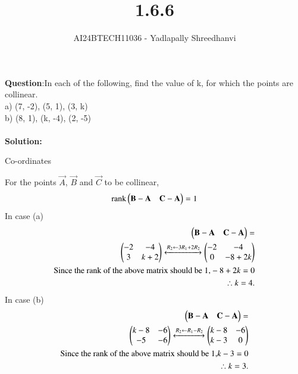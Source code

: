 \documentclass[journal]{IEEEtran}
\begin{document}

\vspace{3cm}

\title{1.6.6}
\author{AI24BTECH11036 - Yadlapally Shreedhanvi}
{\let\newpage\relax\maketitle}

\renewcommand{\thefigure}{\theenumi}
\renewcommand{\thetable}{\theenumi}
\setlength{\intextsep}{10pt} %


\renewcommand{\thetable}{\theenumi}


\textbf{Question}:In each of the following, find the value of k, for which the points are collinear.\\
a) (7, -2), (5, 1), (3, k)\\
b) (8, 1), (k, -4), (2, -5)\\ \\

\textbf{Solution: }

\begin{table}[h!]    
  \centering
  
  \caption{Co-ordinates}
  \label{tab1.6.6.1}
\end{table}

For the points $\vec{A}$, $\vec{B}$  and  $\vec{C}$ to be collinear,
\begin{align}
	\text{rank} \begin{pmatrix} \mathbf{B-A} & \mathbf{C-A}\end{pmatrix}=1
\end{align}
In case (a)
\begin{align*}
\begin{pmatrix} \mathbf{B-A} & \mathbf{C-A}\end{pmatrix}=\\
\begin{pmatrix} -2 & -4 \\ 3 & k+2\end{pmatrix} 
\xleftrightarrow[]{R_2 \leftarrow {3R_1+2R_2}}
\begin{pmatrix}-2 & -4 \\ 0 & -8+2k\end{pmatrix} \\
\text{Since the rank of the above matrix should be 1,}
-8+2k=0\\
\therefore k=4.
\end{align*}
In case (b)
\begin{align*}
\begin{pmatrix} \mathbf{B-A} & \mathbf{C-A}\end{pmatrix}=\\
\begin{pmatrix} k-8 & -6 \\ -5 & -6\end{pmatrix} 
\xleftrightarrow[]{R_2 \leftarrow {R_1-R_2}}
\begin{pmatrix}k-8 & -6 \\ k-3 & 0\end{pmatrix} \\
\text{Since the rank of the above matrix should be 1,}
k-3=0\\
\therefore k=3.
\end{align*}
\end{document}
